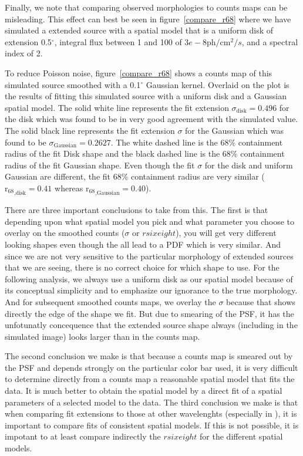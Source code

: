 \documentclass[12pt,preprint]{aastex}
\newcommand{\gev}{\text{GeV}\xspace}
\newcommand{\tev}{\text{TeV}\xspace}
\newcommand{\ph}{\text{ph}\xspace}
\newcommand{\cm}{\text{cm}\xspace}
\newcommand{\rsixeight}{{\ensuremath{\text{r}_{68}}}\xspace}
\renewcommand{\deg}{\ensuremath{^\circ}\xspace}
\begin{document}
Finally, we note that comparing observed morphologies to 
counts maps can be misleading.  This effect can best be seen
in figure~\ref{compare_r68} where we have simulated a
extended source with 
a spatial model that is a uniform disk of extension 0.5\deg,
integral flux between 1 \gev and 100 \gev of $3e-8\ph/\cm^2/s$,
and a spectral index of 2. 

To reduce Poisson noise, figure~\ref{compare_r68} shows a counts map of
this simulated source smoothed with a 0.1\deg Gaussian kernel. Overlaid
on the plot is the results of fitting this simulated source with a uniform
disk and a Gaussian spatial model.  The solid white line represents the
fit extension $\sigma_\text{disk}=0.496$ for the disk which was found to
be in very good agreement with the simulated value.  The solid black line
represents the fit extension $\sigma$ for the Gaussian which was found to
be $\sigma_\text{Gaussian}=0.2627$.  The white dashed line is the 68\%
containment radius of the fit Disk shape and the black dashed line is
the 68\% containment radius of the fit Gaussian shape.  Even though the
fit $\sigma$ for the disk and uniform Gaussian are different, the fit
68\% containment radius are very similar ($\rsixeight_\text{,disk}=0.41$
whereas $\rsixeight_\text{,Gaussian}=0.40$).

There are three important conclusions to take from this. The first is
that depending upon what spatial model you pick and what parameter you
choose to overlay on the smoothed counts ($\sigma$ or $rsixeight$),
you will get very different looking shapes even though the all lead
to a PDF which is very similar. And since we are not very sensitive
to the particular morphology of extended sources that we are seeing,
there is no correct choice for which shape to use. For the following
analysis, we always use a uniform disk as our spatial model because
of its conceptual simplicity and to emphasize our ignorance to the
true morphology. And for subsequent smoothed counts maps, we overlay
the $\sigma$ because that shows directly the edge of the shape we fit.
But due to smearing of the PSF, it has the unfotunatly concequence that
the extended source shape always (including in the simulated image)
looks larger than in the counts map.

The second conclusion we make is that because a counts map is smeared
out by the PSF and depends strongly on the particular color bar used, it
is very difficult to determine directly from a counts map a reasonable
spatial model that fits the data.  It is much better to obtain the
spatial model by a direct fit of a spatial parameters of a selected
model to the data.  The third conclusion we make is that when comparing
fit extensions to those at other wavelenghts (especially in \tev), it is
important to compare fits of consistent spatial models. If this is not
possible, it is impotant to at least compare indirectly the $rsixeight$
for the different spatial models.
\end{document}
